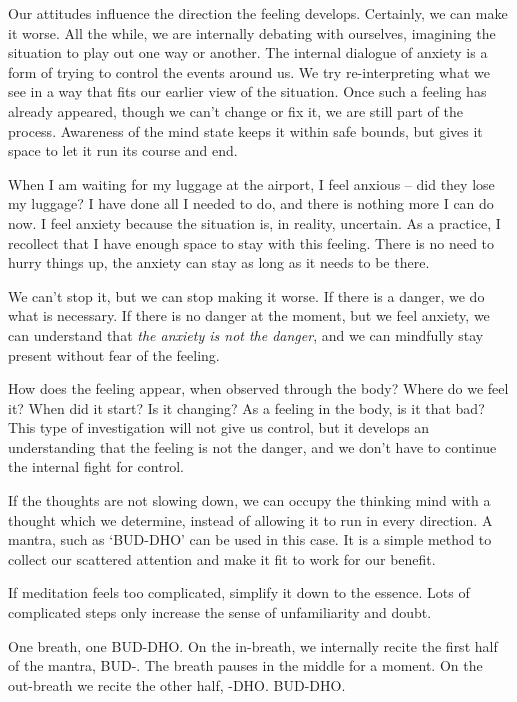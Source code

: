 Our attitudes influence the direction the feeling develops. Certainly,
we can make it worse. All the while, we are internally debating with
ourselves, imagining the situation to play out one way or another. The
internal dialogue of anxiety is a form of trying to control the events
around us. We try re-interpreting what we see in a way that fits our
earlier view of the situation. Once such a feeling has already appeared,
though we can't change or fix it, we are still part of the process.
Awareness of the mind state keeps it within safe bounds, but gives it
space to let it run its course and end.

When I am waiting for my luggage at the airport, I feel anxious -- did
they lose my luggage? I have done all I needed to do, and there is
nothing more I can do now. I feel anxiety because the situation is, in
reality, uncertain. As a practice, I recollect that I have enough space
to stay with this feeling. There is no need to hurry things up, the
anxiety can stay as long as it needs to be there.

We can't stop it, but we can stop making it worse. If there is a danger,
we do what is necessary. If there is no danger at the moment, but we
feel anxiety, we can understand that \emph{the anxiety is not the
danger}, and we can mindfully stay present without fear of the feeling.


How does the feeling appear, when observed through the body? Where do we
feel it? When did it start? Is it changing? As a feeling in the body, is
it that bad? This type of investigation will not give us control, but it
develops an understanding that the feeling is not the danger, and we
don't have to continue the internal fight for control.

If the thoughts are not slowing down, we can occupy the thinking mind
with a thought which we determine, instead of allowing it to run in
every direction. A mantra, such as `BUD-DHO' can be used in this case.
It is a simple method to collect our scattered attention and make it fit
to work for our benefit.

If meditation feels too complicated, simplify it down to the essence.
Lots of complicated steps only increase the sense of unfamiliarity and
doubt.

\enlargethispage*{\baselineskip}

One breath, one BUD-DHO. On the in-breath, we internally recite the
first half of the mantra, BUD-. The breath pauses in the middle for a
moment. On the out-breath we recite the other half, -DHO. BUD-DHO.

